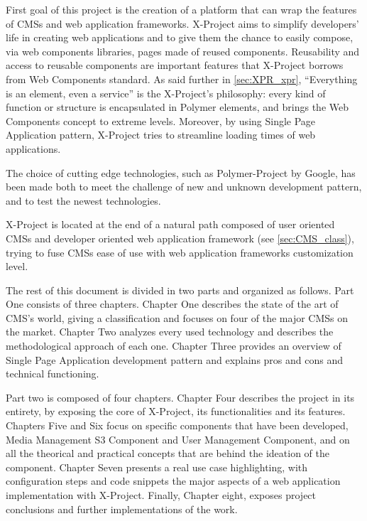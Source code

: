 First goal of this project is the creation of a platform that can wrap the features of CMSs and web application frameworks. 
X-Project aims to simplify developers' life in creating web applications and to give them the chance to easily compose, via web components libraries, pages made of reused components.
Reusability and access to reusable components are important features that X-Project borrows from Web Components standard.
As said further in \ref{sec:XPR_xpr}, ``Everything is an element, even a service'' is the X-Project's philosophy: every kind of function or structure is encapsulated in Polymer elements, and brings the Web Components concept to extreme levels. 
Moreover, by using Single Page Application pattern, X-Project tries to streamline loading times of web applications.

The choice of cutting edge technologies, such as Polymer-Project by Google, has been made both to meet the challenge of new and unknown development pattern, and to test the newest technologies.

X-Project is located at the end of a natural path composed of user oriented CMSs and developer oriented web application framework (see \ref{sec:CMS_class}), trying to fuse CMSs ease of use with web application frameworks customization level.

The rest of this document is divided in two parts and organized as follows. Part One consists of three chapters. Chapter One describes the state of the art of CMS's world, giving a classification and focuses on four of the major CMSs on the market. Chapter Two analyzes every used technology and describes the methodological approach of each one. Chapter Three provides an overview of Single Page Application development pattern and explains pros and cons and technical functioning.

Part two is composed of four chapters. Chapter Four describes the project in its entirety, by exposing the core of X-Project, its functionalities and its features.
Chapters Five and Six focus on specific components that have been developed, Media Management S3 Component and User Management Component, and on all the theorical and practical concepts that are behind the ideation of the component. 
Chapter Seven presents a real use case highlighting, with configuration steps and code snippets the major aspects of a web application implementation with X-Project.
Finally, Chapter eight, exposes project conclusions and further implementations of the work.



